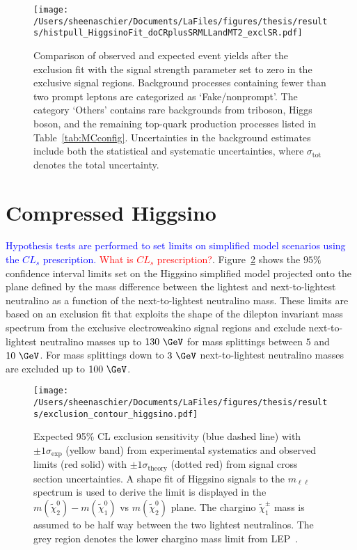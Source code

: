 {\renewcommand{\arraystretch}{1.3}


\begin{figure}
\centering
 \texttt{[image: /Users/sheenaschier/Documents/LaFiles/figures/thesis/results/histpull\_HiggsinoFit\_doCRplusSRMLLandMT2\_exclSR.pdf]}
 \caption{Comparison of observed and expected event yields after the
exclusion fit with the signal strength parameter set to zero in the exclusive signal regions.
Background processes containing fewer than two prompt leptons are categorized as `Fake/nonprompt'.
The category `Others' contains rare backgrounds from triboson, Higgs boson, and the remaining top-quark
  production processes listed in Table~\ref{tab:MCconfig}. Uncertainties in the background estimates include
     both the statistical and systematic uncertainties, where $\sigma_\text{tot}$ denotes the total uncertainty.}
     \label{fig:pull_plot_summary_yields:exclSRs}
 \end{figure}
\FloatBarrier

\section{Compressed Higgsino}
\textcolor{blue}{Hypothesis tests are performed to set limits on simplified model scenarios using the $CL_s$ prescription.} \textcolor{red}{What is $CL_s$ prescription?}. Figure~\ref{fig:exclusion_contour_higgsino} shows the $95\%$ confidence interval limits set on the Higgsino simplified model projected onto the plane defined by the mass difference between the lightest and next-to-lightest neutralino as a function of the next-to-lightest neutralino mass.  These limits are based on an exclusion fit that exploits the shape of the dilepton invariant mass spectrum from the exclusive electroweakino signal regions and exclude next-to-lightest neutralino masses up to $130~\GeV$ for mass splittings between $5$ and $10~\GeV$.  For mass splittings down to $3~\GeV$ next-to-lightest neutralino masses are excluded up to $100~\GeV$. 

 \begin{figure}
 \centering
 \texttt{[image: /Users/sheenaschier/Documents/LaFiles/figures/thesis/results/exclusion\_contour\_higgsino.pdf]}
  \caption{
 Expected 95\% CL exclusion sensitivity (blue dashed line) with $\pm 1 \sigma_\text{exp}$ (yellow band) from experimental systematics
   and observed limits (red solid) with $\pm 1 \sigma_\text{theory}$ (dotted red) from signal cross section uncertainties.
A shape fit of Higgsino signals to the $m_{\ell\ell}$ spectrum is used to derive
 the limit is displayed in the $m(\tilde{\chi}^0_2) - m(\tilde{\chi}^0_1)$ vs $m(\tilde{\chi}^0_2)$ plane.
 The chargino $\tilde{\chi}^\pm_1$ mass is assumed to be half way between the two lightest neutralinos.
  The grey region denotes the lower chargino mass limit from LEP~\cite{LEPlimits}.}
   \label{fig:exclusion_contour_higgsino}
 \end{figure}
 \FloatBarrier
 
}
